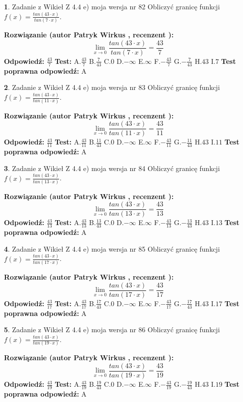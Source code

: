 \documentclass[12pt, a4paper]{article}
\theoremstyle{definition} %
\newtheorem{zad}{}
\newcommand{\zadStart}[1]{\begin{zad}#1\newline}
\newcommand{\zadStop}{\end{zad}}
\newcommand{\rozwStart}[2]{\noindent \textbf{Rozwiązanie (autor #1 , recenzent #2): }\newline}
\newcommand{\rozwStop}{\newline}
\newcommand{\odpStart}{\noindent \textbf{Odpowiedź:}\newline}
\newcommand{\odpStop}{\newline}
\newcommand{\testStart}{\noindent \textbf{Test:}\newline}
\newcommand{\testStop}{\newline}
\newcommand{\kluczStart}{\noindent \textbf{Test poprawna odpowiedź:}\newline}
\newcommand{\kluczStop}{\newline}
\begin{document}
\zadStart{Zadanie z Wikieł Z 4.4 e) moja wersja nr 82}
Obliczyć granicę funkcji $f(x)=\frac{tan(43\cdot x)}{tan(7\cdot x)}$.
\zadStop
\rozwStart{Patryk Wirkus}{}
$$\lim\limits_{x\to 0}\frac{tan(43\cdot x)}{tan(7\cdot x)}=
\frac{43}{7}$$
\rozwStop
\odpStart
$\frac{43}{7}$
\odpStop
\testStart
A.$\frac{43}{7}$
B.$\frac{7}{43}$
C.$0$
D.$-\infty$
E.$\infty$
F.$-\frac{43}{7}$
G.$-\frac{7}{43}$
H.$43$
I.$7$
\testStop
\kluczStart
A
\kluczStop



\zadStart{Zadanie z Wikieł Z 4.4 e) moja wersja nr 83}
Obliczyć granicę funkcji $f(x)=\frac{tan(43\cdot x)}{tan(11\cdot x)}$.
\zadStop
\rozwStart{Patryk Wirkus}{}
$$\lim\limits_{x\to 0}\frac{tan(43\cdot x)}{tan(11\cdot x)}=
\frac{43}{11}$$
\rozwStop
\odpStart
$\frac{43}{11}$
\odpStop
\testStart
A.$\frac{43}{11}$
B.$\frac{11}{43}$
C.$0$
D.$-\infty$
E.$\infty$
F.$-\frac{43}{11}$
G.$-\frac{11}{43}$
H.$43$
I.$11$
\testStop
\kluczStart
A
\kluczStop



\zadStart{Zadanie z Wikieł Z 4.4 e) moja wersja nr 84}
Obliczyć granicę funkcji $f(x)=\frac{tan(43\cdot x)}{tan(13\cdot x)}$.
\zadStop
\rozwStart{Patryk Wirkus}{}
$$\lim\limits_{x\to 0}\frac{tan(43\cdot x)}{tan(13\cdot x)}=
\frac{43}{13}$$
\rozwStop
\odpStart
$\frac{43}{13}$
\odpStop
\testStart
A.$\frac{43}{13}$
B.$\frac{13}{43}$
C.$0$
D.$-\infty$
E.$\infty$
F.$-\frac{43}{13}$
G.$-\frac{13}{43}$
H.$43$
I.$13$
\testStop
\kluczStart
A
\kluczStop



\zadStart{Zadanie z Wikieł Z 4.4 e) moja wersja nr 85}
Obliczyć granicę funkcji $f(x)=\frac{tan(43\cdot x)}{tan(17\cdot x)}$.
\zadStop
\rozwStart{Patryk Wirkus}{}
$$\lim\limits_{x\to 0}\frac{tan(43\cdot x)}{tan(17\cdot x)}=
\frac{43}{17}$$
\rozwStop
\odpStart
$\frac{43}{17}$
\odpStop
\testStart
A.$\frac{43}{17}$
B.$\frac{17}{43}$
C.$0$
D.$-\infty$
E.$\infty$
F.$-\frac{43}{17}$
G.$-\frac{17}{43}$
H.$43$
I.$17$
\testStop
\kluczStart
A
\kluczStop



\zadStart{Zadanie z Wikieł Z 4.4 e) moja wersja nr 86}
Obliczyć granicę funkcji $f(x)=\frac{tan(43\cdot x)}{tan(19\cdot x)}$.
\zadStop
\rozwStart{Patryk Wirkus}{}
$$\lim\limits_{x\to 0}\frac{tan(43\cdot x)}{tan(19\cdot x)}=
\frac{43}{19}$$
\rozwStop
\odpStart
$\frac{43}{19}$
\odpStop
\testStart
A.$\frac{43}{19}$
B.$\frac{19}{43}$
C.$0$
D.$-\infty$
E.$\infty$
F.$-\frac{43}{19}$
G.$-\frac{19}{43}$
H.$43$
I.$19$
\testStop
\kluczStart
A
\kluczStop
\end{document}
